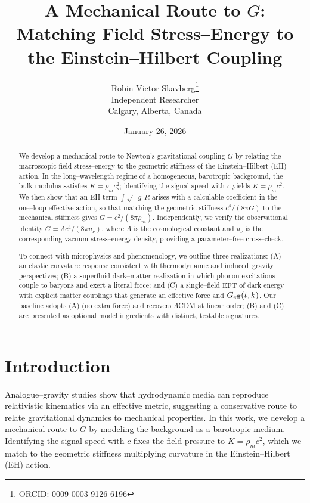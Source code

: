 \documentclass[11pt,a4paper]{article}
\title{\textbf{A Mechanical Route to \texorpdfstring{$G$}{G}: Matching Field Stress--Energy to the Einstein--Hilbert Coupling}}
\author{
    Robin Victor Skavberg\thanks{ORCID: \href{https://orcid.org/0009-0003-9126-6196}{0009-0003-9126-6196}} \\
    \small Independent Researcher \\
    \small Calgary, Alberta, Canada
}
\date{January 26, 2026}
\begin{document}
\maketitle

\begin{abstract}
We develop a mechanical route to Newton’s gravitational coupling $G$ by relating the macroscopic field stress--energy to the geometric stiffness of the Einstein--Hilbert (EH) action. In the long--wavelength regime of a homogeneous, barotropic background, the bulk modulus satisfies $K=\rho_m c_s^2$; identifying the signal speed with $c$ yields $K=\rho_m c^2$. We then show that an EH term $\int\!\sqrt{-g}\,R$ arises with a calculable coefficient in the one--loop effective action, so that matching the geometric stiffness $c^4/(8\pi G)$ to the mechanical stiffness gives $G=c^2/(8\pi\rho_m)$. Independently, we verify the observational identity $G=\Lambda c^4/(8\pi u_\nu)$, where $\Lambda$ is the cosmological constant and $u_\nu$ is the corresponding vacuum stress--energy density, providing a parameter--free cross--check.

To connect with microphysics and phenomenology, we outline three realizations: (A) an elastic curvature response consistent with thermodynamic and induced--gravity perspectives; (B) a superfluid dark--matter realization in which phonon excitations couple to baryons and exert a literal force; and (C) a single--field EFT of dark energy with explicit matter couplings that generate an effective force and $G_{\rm eff}(t,k)$. Our baseline adopts (A) (no extra force) and recovers $\Lambda$CDM at linear order; (B) and (C) are presented as optional model ingredients with distinct, testable signatures.
\end{abstract}

\section{Introduction}
Analogue--gravity studies show that hydrodynamic media can reproduce relativistic kinematics via an effective metric,\cite{Unruh1981,Visser1998,Barcelo2011} suggesting a conservative route to relate gravitational dynamics to mechanical properties. In this work, we develop a mechanical route to $G$ by modeling the background as a barotropic medium. Identifying the signal speed with $c$ fixes the field pressure to $K=\rho_m c^2$, which we match to the geometric stiffness multiplying curvature in the Einstein--Hilbert (EH) action.\cite{Einstein1916,Hilbert1915}
\end{document}
